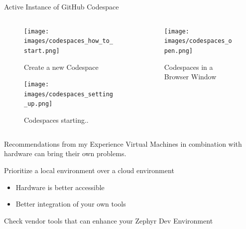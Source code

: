 \documentclass[10pt, aspectratio=169]{beamer}
\begin{document}
\begin{frame}[fragile]{Active Instance of GitHub Codespace}
  \begin{columns}
    \begin{column}{0.4\textwidth}
      \begin{figure}
        \texttt{[image: images/codespaces\_how\_to\_start.png]}
        \caption{Create a new Codespace}
      \end{figure}
      \begin{figure}
        \texttt{[image: images/codespaces\_setting\_up.png]}
        \caption{Codespaces starting..}
      \end{figure}
    \end{column}
    \begin{column}{0.6\textwidth}
      \begin{figure}
        \texttt{[image: images/codespaces\_open.png]}
        \caption{Codespaces in a Browser Window}
      \end{figure}
    \end{column}
  \end{columns}
\end{frame}
\begin{frame}[fragile]{Recommendations from my Experience}
Virtual Machines in combination with hardware can bring their own problems.

Prioritize a local environment over a cloud environment
  \begin{itemize}
    \item Hardware is better accessible
    \item Better integration of your own tools
  \end{itemize}

        Check vendor tools that can enhance your Zephyr Dev Environment
\end{frame}
\end{document}
